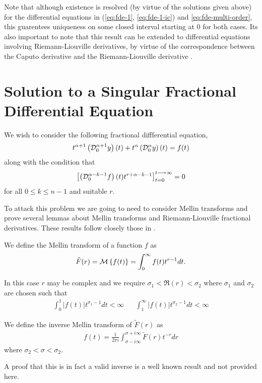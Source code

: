 \documentclass{unswmaths}
\begin{document}
Note that although existence is resolved (by virtue of the solutions given above)
for the differential equations in (\ref{eq:fde-1}, \ref{eq:fde-1-ic}) and \ref{eq:fde-multi-order}, this 
guarentees uniqueness on some closed interval starting at $ 0 $ for both cases. Its also important
to note that this result can be extended to differential equations involving Riemann-Liouville derivatives, by 
virtue of the correspondence between the Caputo derivative and the Riemann-Liouville derivative \cite{Podlubny1999}. 

\section*{Solution to a Singular Fractional Differential Equation}

We wish to consider the following fractional diffferential equation,  
\begin{align}
\label{eq:fde-singular}
	t^{\alpha + 1} \left( \mathcal{D}_{0}^{\alpha + 1} y \right)(t) + t^\alpha \left( \mathcal{D}_{0}^{\alpha} y \right)(t) = f(t)
\end{align}
along with the condition that
\begin{align}
	\left[ \left( \mathcal{D}_{0}^{\alpha-k-1} f \right)(t)t^{r+\alpha-k-1} \right]_{t=0}^{t \longrightarrow \infty} = 0
\end{align}
for all $ 0 \leq k \leq n - 1 $ and suitable $ r $.

To attack this problem we are going to need to consider Mellin transforms and prove several lemmas about Mellin transforms
and Riemann-Liouville fractional derivatives. These results follow closely those in \cite{Podlubny1999}.

\begin{definition}
	We define the Mellin transform of a function $ f $ as
	\begin{align*}
		\tilde{F}(r) = \mathcal{M} \left\{ f(t) \right\} = \int_0^\infty f(t)t^{r-1} dt.
	\end{align*}
\end{definition}
In this case $ r $ may be complex and we require $ \sigma_1 < \Re(r) < \sigma_2 $ 
where $ \sigma_1 $ and $ \sigma_2 $ are chosen such that 
\begin{align*}
	\int_0^1|f(t)|t^{\sigma_1 - 1}dt < \infty && \int_1^\infty |f(t)|t^{\sigma_2 - 1}dt < \infty
\end{align*}

\begin{definition}
		We define the inverse Mellin transform of $ \tilde{F}(r) $ as
		\begin{align*}
			f(t) = \frac{1}{2 \pi i} \int_{\sigma - i\infty}^{\sigma + i \infty} \tilde{F}(r)t^{-r} dr 
		\end{align*}
		where $ \sigma_2 < \sigma < \sigma_2 $.
\end{definition}
A proof that this is in fact a valid inverse is a well known result and not provided here.
\end{document}
